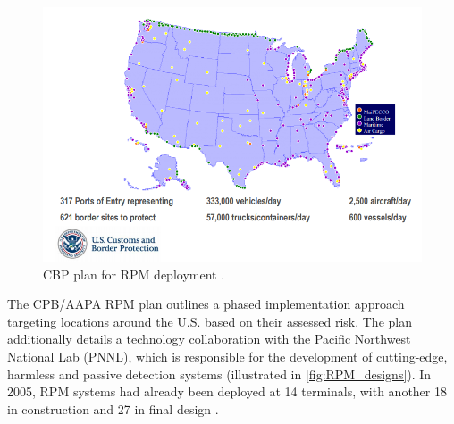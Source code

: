 \documentclass{report}
\begin{document}
\begin{figure}[h]
 \centering
 \includegraphics[trim = 0cm 0cm 0cm 0cm, clip,scale=0.55]{./figures/RPM_map.png}
   \caption{CBP plan for RPM deployment \cite{Simmons2005}.}
     \label{fig:RPM_map}
\end{figure}


The CPB/AAPA RPM plan outlines a phased implementation approach targeting locations around the U.S. based on their assessed risk. The plan additionally details a technology collaboration with the Pacific Northwest National Lab (PNNL), which is responsible for the development of cutting-edge, harmless and passive detection systems (illustrated in \autoref{fig:RPM_designs}). In 2005, RPM systems had already been deployed at 14 terminals, with another 18 in construction and 27 in final design \cite{Simmons2005}.
\end{document}
